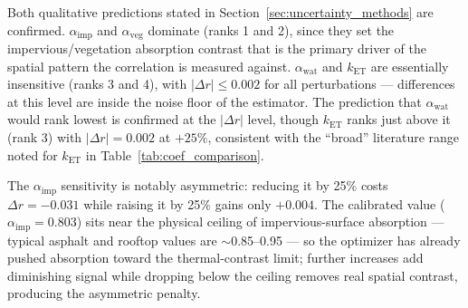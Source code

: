 \documentclass[12pt, letterpaper]{article}
\begin{document}
Both qualitative predictions stated in Section~\ref{sec:uncertainty_methods}
are confirmed. $\alpha_{\mathrm{imp}}$ and $\alpha_{\mathrm{veg}}$ dominate
(ranks 1 and 2), since they set the impervious/vegetation absorption contrast
that is the primary driver of the spatial pattern the correlation is measured
against. $\alpha_{\mathrm{wat}}$ and $k_{\mathrm{ET}}$ are essentially
insensitive (ranks 3 and 4), with $|\Delta r| \leq 0.002$ for all
perturbations — differences at this level are inside the noise floor of the
estimator. The prediction that $\alpha_{\mathrm{wat}}$ would rank lowest is
confirmed at the $|\Delta r|$ level, though $k_{\mathrm{ET}}$ ranks just
above it (rank 3) with $|\Delta r| = 0.002$ at $+25\%$, consistent with the
``broad'' literature range noted for $k_{\mathrm{ET}}$ in
Table~\ref{tab:coef_comparison}.

The $\alpha_{\mathrm{imp}}$ sensitivity is notably asymmetric: reducing it by
25\% costs $\Delta r = -0.031$ while raising it by 25\% gains only $+0.004$.
The calibrated value ($\alpha_{\mathrm{imp}} = 0.803$) sits near the physical
ceiling of impervious-surface absorption — typical asphalt and rooftop values
are $\sim$0.85--0.95 — so the optimizer has already pushed absorption toward
the thermal-contrast limit; further increases add diminishing signal while
dropping below the ceiling removes real spatial contrast, producing the
asymmetric penalty.
\end{document}
